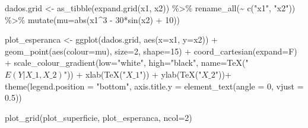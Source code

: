 \documentclass[
  a4paperpaper,
]{article}
\newenvironment{Shaded}{\begin{snugshade}}{\end{snugshade}}
\newcommand{\AttributeTok}[1]{\textcolor[rgb]{0.40,0.45,0.13}{#1}}
\newcommand{\DecValTok}[1]{\textcolor[rgb]{0.68,0.00,0.00}{#1}}
\newcommand{\FloatTok}[1]{\textcolor[rgb]{0.68,0.00,0.00}{#1}}
\newcommand{\FunctionTok}[1]{\textcolor[rgb]{0.28,0.35,0.67}{#1}}
\newcommand{\NormalTok}[1]{\textcolor[rgb]{0.00,0.23,0.31}{#1}}
\newcommand{\OtherTok}[1]{\textcolor[rgb]{0.00,0.23,0.31}{#1}}
\newcommand{\SpecialCharTok}[1]{\textcolor[rgb]{0.37,0.37,0.37}{#1}}
\newcommand{\StringTok}[1]{\textcolor[rgb]{0.13,0.47,0.30}{#1}}
\begin{document}
\begin{Shaded}
\begin{Highlighting}[]
\NormalTok{dados.grid }\OtherTok{\textless{}{-}} \FunctionTok{as\_tibble}\NormalTok{(}\FunctionTok{expand.grid}\NormalTok{(x1, x2)) }\SpecialCharTok{\%\textgreater{}\%}
  \FunctionTok{rename\_all}\NormalTok{(}\SpecialCharTok{\textasciitilde{}} \FunctionTok{c}\NormalTok{(}\StringTok{"x1"}\NormalTok{, }\StringTok{"x2"}\NormalTok{)) }\SpecialCharTok{\%\textgreater{}\%}
  \FunctionTok{mutate}\NormalTok{(}\AttributeTok{mu=}\FunctionTok{abs}\NormalTok{(x1}\SpecialCharTok{\^{}}\DecValTok{3} \SpecialCharTok{{-}} \DecValTok{30}\SpecialCharTok{*}\FunctionTok{sin}\NormalTok{(x2) }\SpecialCharTok{+} \DecValTok{10}\NormalTok{))}

\NormalTok{plot\_esperanca }\OtherTok{\textless{}{-}} \FunctionTok{ggplot}\NormalTok{(dados.grid, }\FunctionTok{aes}\NormalTok{(}\AttributeTok{x=}\NormalTok{x1, }\AttributeTok{y=}\NormalTok{x2)) }\SpecialCharTok{+}
  \FunctionTok{geom\_point}\NormalTok{(}\FunctionTok{aes}\NormalTok{(}\AttributeTok{colour=}\NormalTok{mu), }\AttributeTok{size=}\DecValTok{2}\NormalTok{, }\AttributeTok{shape=}\DecValTok{15}\NormalTok{) }\SpecialCharTok{+}
  \FunctionTok{coord\_cartesian}\NormalTok{(}\AttributeTok{expand=}\NormalTok{F) }\SpecialCharTok{+}
  \FunctionTok{scale\_colour\_gradient}\NormalTok{(}\AttributeTok{low=}\StringTok{"white"}\NormalTok{,}
  \AttributeTok{high=}\StringTok{"black"}\NormalTok{,}
  \AttributeTok{name=}\FunctionTok{TeX}\NormalTok{(}\StringTok{"$E(Y|X\_1, X\_2)$"}\NormalTok{)) }\SpecialCharTok{+}
  \FunctionTok{xlab}\NormalTok{(}\FunctionTok{TeX}\NormalTok{(}\StringTok{"$X\_1$"}\NormalTok{)) }\SpecialCharTok{+} \FunctionTok{ylab}\NormalTok{(}\FunctionTok{TeX}\NormalTok{(}\StringTok{"$X\_2$"}\NormalTok{))}\SpecialCharTok{+}
  \FunctionTok{theme}\NormalTok{(}\AttributeTok{legend.position =} \StringTok{"bottom"}\NormalTok{,}
        \AttributeTok{axis.title.y =} \FunctionTok{element\_text}\NormalTok{(}\AttributeTok{angle =} \DecValTok{0}\NormalTok{, }\AttributeTok{vjust =} \FloatTok{0.5}\NormalTok{))}

\FunctionTok{plot\_grid}\NormalTok{(plot\_superficie, plot\_esperanca, }\AttributeTok{ncol=}\DecValTok{2}\NormalTok{)}
\end{Highlighting}
\end{Shaded}
\end{document}
